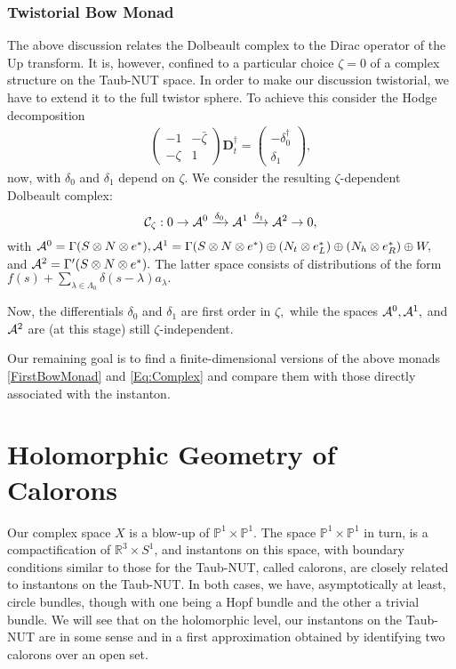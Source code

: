 \documentclass[12pt]{article}
\theoremstyle{definition}
\theoremstyle{remark}
\numberwithin{theorem}{section}
\def\bR{{\mathbb {R}}}
\def\bP{{\mathbb {P}}}
\begin{document}
\subsubsection{Twistorial Bow Monad}
The above discussion relates the Dolbeault complex to the Dirac operator of the Up transform.  It is, however, confined to a particular choice $\zeta=0$ of a complex structure on the Taub-NUT space.  In order to make our discussion twistorial, we have to extend it to the full twistor sphere.  To achieve this consider the Hodge  decomposition
\begin{align}
\left(\begin{array}{cc} -1 & -\bar{\zeta}\\ -\zeta & 1 \end{array}\right){\mathbf D}^\dagger_t=\begin{pmatrix} -\delta_0^\dagger \\ \delta_1\end{pmatrix},
\end{align}
now, with $\delta_0$ and $\delta_1$ depend on $\zeta.$
We consider the resulting $\zeta$-dependent Dolbeault complex:
\begin{equation}\label{Eq:Complex}
{\cal C}_\zeta: 0\rightarrow {\cal A}^0\xrightarrow{\delta_0}{\cal A}^1\xrightarrow{\delta_1}{\cal A}^2\rightarrow 0,
\end{equation}
with 
${\cal A}^0=\Gamma(S\otimes N\otimes e^*), {\cal A}^1=\Gamma(S\otimes N\otimes e^*)\oplus (N_t\otimes e_L^*)\oplus (N_h\otimes e_R^*)\oplus W,$ and ${\cal A}^2=\Gamma'(S\otimes N\otimes e^*).$ The latter space consists of distributions of the form $f(s)+\sum_{\lambda\in\Lambda_0}\delta(s-\lambda) a_\lambda.$

Now, the differentials $\delta_0$ and $\delta_1$ are first order in $\zeta,$ while the spaces ${\cal A}^0, {\cal A}^1,$ and ${\cal A}^2$ are (at this stage) still $\zeta$-independent.

Our remaining goal is to find a finite-dimensional versions of the above monads \eqref{FirstBowMonad} and \eqref{Eq:Complex} and compare them with those directly associated with the instanton.
 
\section{Holomorphic Geometry of Calorons}
 
 Our complex space $X$ is a blow-up of $\bP^1\times\bP^1$. The space $\bP^1\times\bP^1$ in turn, is a compactification of $\bR^3\times S^1$, and instantons on this space, with boundary conditions similar to those for the Taub-NUT, called calorons, are closely related to instantons on the Taub-NUT. In both cases, we have, asymptotically at least, circle bundles, though with one being a Hopf bundle and the other a trivial bundle.  We will see that on the holomorphic level, our instantons on the Taub-NUT are in some sense and in a first approximation obtained by  identifying two calorons over an open set.  
 
\end{document}
